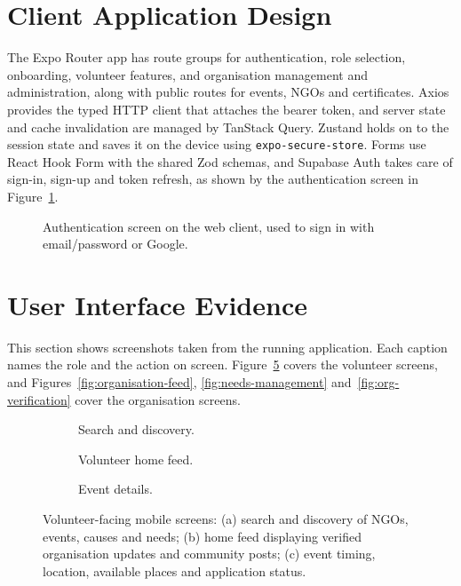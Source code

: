 \section{Client Application Design}
\label{sec:impl-client}
The Expo Router app has route groups for authentication, role selection, onboarding, volunteer features, and organisation management and administration, along with public routes for events, NGOs and certificates. Axios provides the typed HTTP client that attaches the bearer token, and server state and cache invalidation are managed by TanStack Query. Zustand holds on to the session state and saves it on the device using \texttt{expo-secure-store}. Forms use React Hook Form with the shared Zod schemas, and Supabase Auth takes care of sign-in, sign-up and token refresh, as shown by the authentication screen in Figure~\ref{fig:navigation}.

\begin{figure}[H]
    \centering
    \caption{Authentication screen on the web client, used to sign in with email/password or Google.}
    \label{fig:navigation}
\end{figure}

\section{User Interface Evidence}
\label{sec:impl-ui}
This section shows screenshots taken from the running application. Each caption names the role and the action on screen. Figure~\ref{fig:ui-volunteer} covers the volunteer screens, and Figures~\ref{fig:organisation-feed}, \ref{fig:needs-management} and~\ref{fig:org-verification} cover the organisation screens.

\begin{figure}[H]
\centering
\begin{subfigure}[t]{0.31\textwidth}
  \centering
  \caption{Search and discovery.}
  \label{fig:search-discovery}
\end{subfigure}\hfill
\begin{subfigure}[t]{0.31\textwidth}
  \centering
  \caption{Volunteer home feed.}
  \label{fig:volunteer-home}
\end{subfigure}\hfill
\begin{subfigure}[t]{0.31\textwidth}
  \centering
  \caption{Event details.}
  \label{fig:event-details}
\end{subfigure}
\caption{Volunteer-facing mobile screens: (a) search and discovery of NGOs, events, causes and needs; (b) home feed displaying verified organisation updates and community posts; (c) event timing, location, available places and application status.}
\label{fig:ui-volunteer}
\end{figure}

